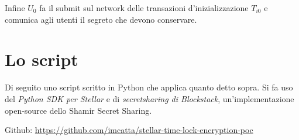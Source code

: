 Infine $ U_0 $ fa il submit sul network delle transazioni
d'inizializzazione $ T_{i0} $ e comunica agli utenti il segreto che
devono conservare.





\section{Lo script}
Di seguito uno script scritto in Python che applica quanto detto sopra.
Si fa uso del \textit{Python SDK per Stellar} e di
\textit{secretsharing di Blockstack}, un'implementazione open-source dello
Shamir Secret Sharing.

Github:
\url{https://github.com/imcatta/stellar-time-lock-encryption-poc}